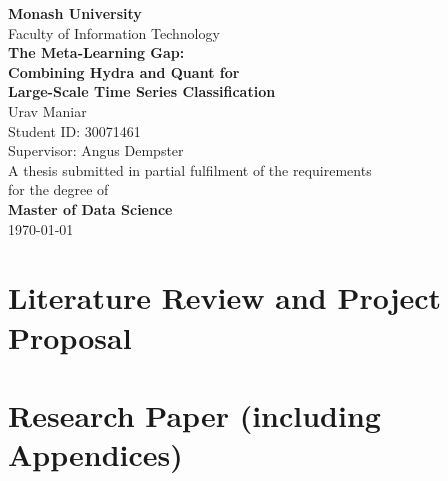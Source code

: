 \documentclass[12pt,a4paper,oneside]{report}
\begin{document}
\begin{titlepage}
\centering
\vspace*{1.5cm}

{\LARGE\bfseries Monash University}\\[0.5cm]
{\large Faculty of Information Technology}\\[2cm]

{\Huge\bfseries The Meta-Learning Gap:\\[0.4cm]
Combining Hydra and Quant for\\[0.4cm]
Large-Scale Time Series Classification}\\[2cm]

{\Large Urav Maniar}\\[0.4cm]
{\large Student ID: 30071461}\\[0.2cm]
{\large Supervisor: Angus Dempster}\\[2cm]

{\large A thesis submitted in partial fulfilment of the requirements\\[0.3cm]
for the degree of}\\[0.5cm]
{\large\bfseries Master of Data Science}\\[1.5cm]

{\large \today}

\vfill

\end{titlepage}

\tableofcontents
\clearpage

\part{Literature Review and Project Proposal}



\part{Research Paper (including Appendices)}


\end{document}
